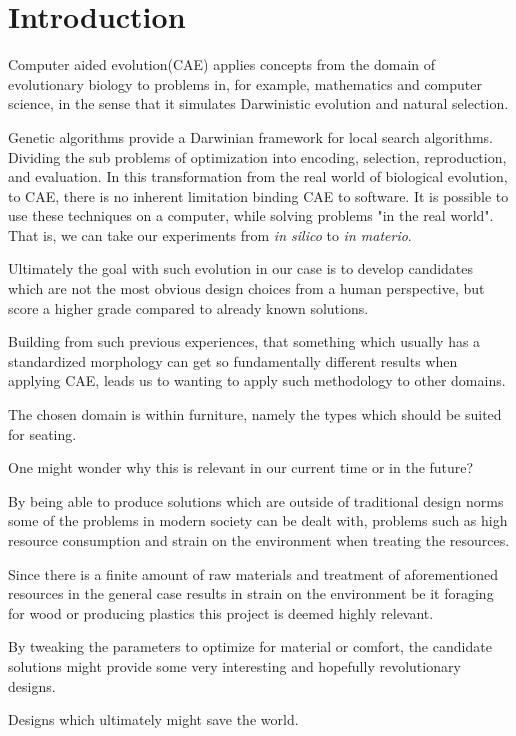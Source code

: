 \section{Introduction}
Computer aided evolution(CAE) applies concepts from the domain of evolutionary
biology to problems in, for example, mathematics and computer science, in the
sense that it simulates Darwinistic evolution and natural selection.

Genetic algorithms provide a Darwinian framework for local search algorithms.
Dividing the sub problems of optimization into encoding, selection,
reproduction, and evaluation. In this transformation from the real world of
biological evolution, to CAE, there is no inherent limitation binding CAE to
software. It is possible to use these techniques on a computer, while solving
problems "in the real world". That is, we can take our experiments from \emph{in
silico} to \emph{in materio}\cite{paper:ev3}.

Ultimately the goal with such evolution in our case is to develop candidates
which are not the most obvious design choices from a human perspective, but
score a higher grade compared to already known solutions.

Building from such previous experiences, that something which usually has a
standardized morphology can get so fundamentally different results when applying
CAE, leads us to wanting to apply such methodology to other domains.

The chosen domain is within furniture, namely the types which should be suited
for seating.

One might wonder why this is relevant in our current time or in the future?

By being able to produce solutions which are outside of traditional design norms
some of the problems in modern society can be dealt with, problems such as high
resource consumption and strain on the environment when treating the resources.

Since there is a finite amount of raw materials and treatment of aforementioned
resources in the general case results in strain on the environment be it
foraging for wood or producing plastics this project is deemed highly relevant.

By tweaking the parameters to optimize for material or comfort, the candidate
solutions might provide some very interesting and hopefully revolutionary
designs.

Designs which ultimately might save the world. 
